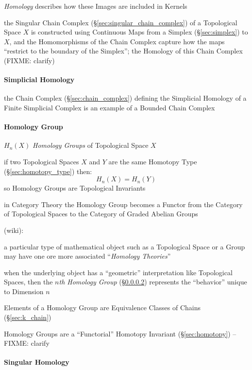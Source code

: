 \emph{Homology} describes how these Images are included in Kernels

the Singular Chain Complex (\S\ref{sec:singular_chain_complex}) of a
Topological Space $X$ is constructed using Continuous Maps from a Simplex
(\S\ref{sec:simplex}) to $X$, and the Homomorphisms of the Chain Complex
capture how the maps ``restrict to the boundary of the Simplex''; the Homology
of this Chain Complex (FIXME: clarify)



\paragraph{Simplicial Homology}\label{sec:simplicial_homology}\hfill

the Chain Complex (\S\ref{sec:chain_complex}) defining the Simplicial Homology
of a Finite Simplicial Complex is an example of a Bounded Chain Complex



\paragraph{Homology Group}\label{sec:homology_group}\hfill

$H_n(X)$ \emph{Homology Groups} of Topological Space $X$

if two Topological Spaces $X$ and $Y$ are the same Homotopy Type
(\S\ref{sec:homotopy_type}) then:
\[
  H_n(X) = H_n(Y)
\]
so Homology Groups are Topological Invariants

in Category Theory the Homology Group becomes a Functor from the Category of
Topological Spaces to the Category of Graded Abelian Groups

(wiki):

a particular type of mathematical object such as a Topological Space or a
Group may have one ore more associated ``\emph{Homology Theories}''

when the underlying object has a ``geometric'' interpretation like Topological
Spaces, then the \emph{$n$th Homology Group} (\S\ref{sec:homology_group})
represents the ``behavior'' unique to Dimension $n$

Elements of a Homology Group are Equivalence
Classes of Chains (\S\ref{sec:k_chain})

Homology Groups are a ``Functorial'' Homotopy Invariant (\S\ref{sec:homotopy})
--FIXME: clarify



\paragraph{Singular Homology}\label{sec:singular_homology}\hfill

